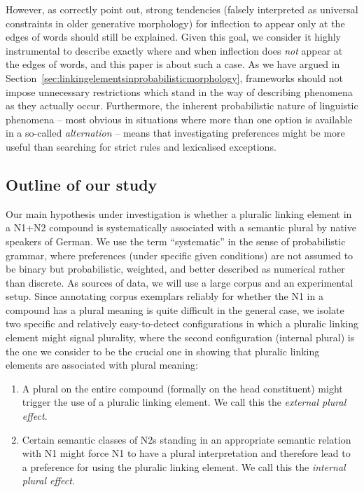 However, as \textcite[5]{KirchnerNicoladis2009} correctly point out, strong tendencies (falsely interpreted as universal constraints in older generative morphology) for inflection to appear only at the edges of words should still be explained.
Given this goal, we consider it highly instrumental to describe exactly where and when inflection does \textit{not} appear at the edges of words, and this paper is about such a case. %
As we have argued in Section~\ref{sec:linkingelementsinprobabilisticmorphology}, frameworks should not impose unnecessary restrictions which stand in the way of describing phenomena as they actually occur.
Furthermore, the inherent probabilistic nature of linguistic phenomena -- most obvious in situations where more than one option is available in a so-called \textit{alternation} -- means that investigating preferences might be more useful than searching for strict rules and lexicalised exceptions.

\subsection{Outline of our study}

Our main hypothesis under investigation is whether a pluralic linking element in a N1+N2 compound is systematically associated with a semantic plural by native speakers of German.
We use the term ``systematic'' in the sense of probabilistic grammar, where preferences (under specific given conditions) are not assumed to be binary but probabilistic, weighted, and better described as numerical rather than discrete.
As sources of data, we will use a large corpus and an experimental setup.
Since annotating corpus exemplars reliably for whether the N1 in a compound has a plural meaning is quite difficult in the general case, we isolate two specific and relatively easy-to-detect configurations in which a pluralic linking element might signal plurality, where the second configuration (internal plural) is the one we consider to be the crucial one in showing that pluralic linking elements are associated with plural meaning:

\vspace{\baselineskip}

\begin{enumerate}
  \item A plural on the entire compound (formally on the head constituent) might trigger the use of a pluralic linking element.
  We call this the \textit{external plural effect}.
  \item Certain semantic classes of N2s standing in an appropriate semantic relation with N1 might force N1 to have a plural interpretation and therefore lead to a preference for using the pluralic linking element.
  We call this the \textit{internal plural effect}.
\end{enumerate}

